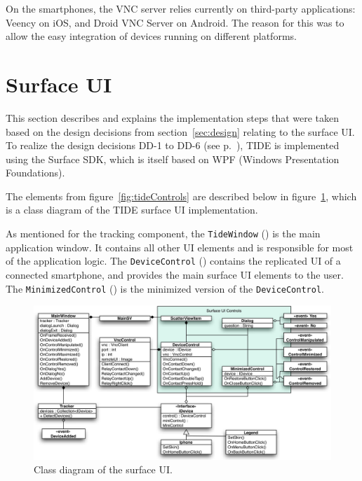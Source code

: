 On the smartphones, the VNC server relies currently on third-party applications: Veency on iOS, and Droid VNC Server on Android.
The reason for this was to allow the easy integration of devices running on different platforms.



\section{Surface UI}
\label{sec:surfaceui}

This section describes and explains the implementation steps that were taken based on the design decisions from section~\ref{sec:design} relating to the surface UI.
To realize the design decisions DD-1 to DD-6 (see p.~\pageref{DD}), TIDE is implemented using the Surface SDK, which is itself based on WPF (Windows Presentation Foundations).

The elements from figure~\ref{fig:tideControls} are described below in figure~\ref{fig:surfaceDiagram}, which is a class diagram of the TIDE surface UI implementation.

As mentioned for the tracking component, the \texttt{TideWindow} () is the main application window.
It contains all other UI elements and is responsible for most of the application logic.
The \texttt{DeviceControl} () contains the replicated UI of a connected smartphone, and provides the main surface UI elements to the user.
The \texttt{MinimizedControl} () is the minimized version of the \texttt{DeviceControl}.

\begin{figure}[htb]
  \centering
    \includegraphics[width=1\textwidth]{images/surfaceDiagram}
    \caption{Class diagram of the surface UI.}
    \label{fig:surfaceDiagram}
\end{figure}

